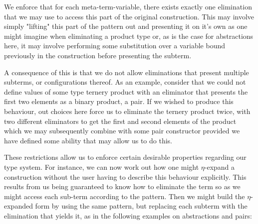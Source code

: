 We enforce that for each meta-term-variable, there exists exactly one
elimination that we may use to access this part of the original
construction. This may involve simply "lifting" this part of the
pattern out and presenting it on it's own as one might imagine when
eliminating a product type or, as is the case for abstractions here, it
may involve performing some substitution over a variable bound
previously in the construction before presenting the subterm.

A consequence of this is that we do not allow eliminations that
present multiple subterms, or configurations thereof. As an example,
consider that we could not define values of some type ternery product
with an eliminator that presents the first two elements as a binary
product, a pair. If we wished to produce this behaviour, out choices
here force us to eliminate the ternery product twice, with two
different eliminators to get the first and second elements of the
product which we may subsequently combine with some pair constructor
provided we have defined some ability that may allow us to do this.

These restrictions allow us to enforce certain desirable properties
regarding our type system. For instance, we can now work out how one
might $\eta$-expand a construction without the user having to describe
this behaviour explicitly. This results from us being guaranteed to
know how to eliminate the term so as we might access each sub-term
according to the pattern. Then we might build the $\eta$-expanded form
by using the same pattern, but replacing each subterm with the
elimination that yields it, as in the following examples on
abstractions and pairs:


